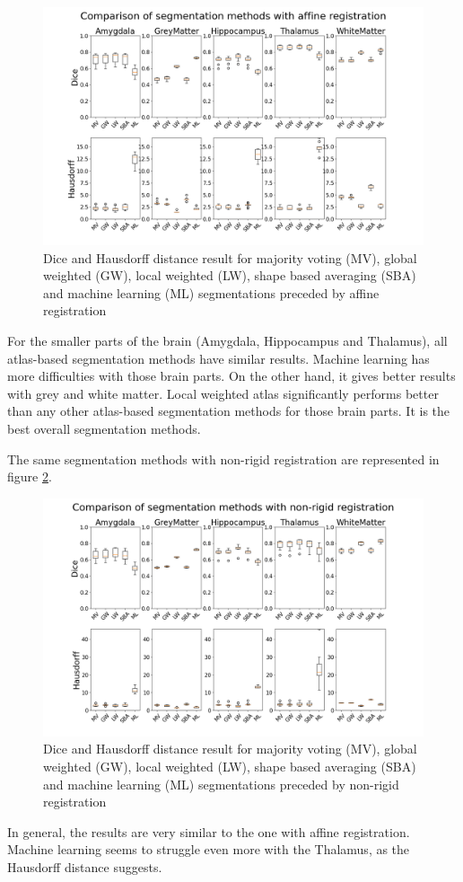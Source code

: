 \begin{figure}[h!]
	\centering
	\includegraphics[width = .48 \textwidth]{img/boxplot_Affine_all}
	\caption{Dice and Hausdorff distance result for majority voting (MV), global weighted (GW), local weighted (LW), shape based averaging (SBA) and machine learning (ML) segmentations preceded by affine registration}
	\label{fig:boxplotAff}
\end{figure}

For the smaller parts of the brain (Amygdala, Hippocampus and Thalamus), all atlas-based segmentation methods have similar results. Machine learning has more difficulties with those brain parts. On the other hand, it gives better results with grey and white matter. Local weighted atlas significantly performs better than any other atlas-based segmentation methods for those brain parts. It is the best overall segmentation methods.

The same segmentation methods with non-rigid registration are represented in figure \ref{fig:boxplotNR}.

\begin{figure}[h!]
	\centering
	\includegraphics[width = .48 \textwidth]{img/boxplot_NR_all}
	\caption{Dice and Hausdorff distance result for majority voting (MV), global weighted (GW), local weighted (LW), shape based averaging (SBA) and machine learning (ML) segmentations preceded by non-rigid registration}
	\label{fig:boxplotNR}
\end{figure}

In general, the results are very similar to the one with affine registration. Machine learning seems to struggle even more with the Thalamus, as the Hausdorff distance suggests.
